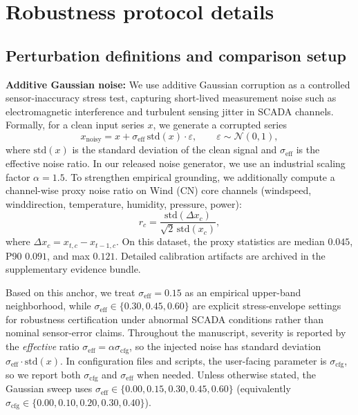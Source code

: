 \documentclass[review,1p,times]{elsarticle}
\begin{document}
\section{Robustness protocol details}\label{app:robust_details}
\subsection{Perturbation definitions and comparison setup}
\noindent\textbf{Additive Gaussian noise:}
We use additive Gaussian corruption as a controlled sensor-inaccuracy stress test, capturing short-lived measurement noise such as electromagnetic interference and turbulent sensing jitter in SCADA channels.
Formally, for a clean input series $x$, we generate a corrupted series
\begin{equation}
x_{\text{noisy}} = x + \sigma_{\mathrm{eff}}\,\mathrm{std}(x)\cdot \varepsilon, \qquad \varepsilon \sim \mathcal{N}(0,1),
\end{equation}
where $\mathrm{std}(x)$ is the standard deviation of the clean signal and $\sigma_{\mathrm{eff}}$ is the effective noise ratio.
In our released noise generator, we use an industrial scaling factor $\alpha=1.5$. To strengthen empirical grounding, we additionally compute a channel-wise proxy noise ratio on Wind (CN) core channels (windspeed, winddirection, temperature, humidity, pressure, power):
\begin{equation}
r_c=\frac{\mathrm{std}(\Delta x_c)}{\sqrt{2}\,\mathrm{std}(x_c)},
\end{equation}
where $\Delta x_c=x_{t,c}-x_{t-1,c}$. On this dataset, the proxy statistics are median $0.045$, P90 $0.091$, and max $0.121$. Detailed calibration artifacts are archived in the supplementary evidence bundle.

Based on this anchor, we treat $\sigma_{\mathrm{eff}}=0.15$ as an empirical upper-band neighborhood, while $\sigma_{\mathrm{eff}}\in\{0.30,0.45,0.60\}$ are explicit stress-envelope settings for robustness certification under abnormal SCADA conditions rather than nominal sensor-error claims. Throughout the manuscript, severity is reported by the \emph{effective} ratio $\sigma_{\mathrm{eff}}=\alpha\sigma_{\mathrm{cfg}}$, so the injected noise has standard deviation $\sigma_{\mathrm{eff}}\cdot\mathrm{std}(x)$. In configuration files and scripts, the user-facing parameter is $\sigma_{\mathrm{cfg}}$, so we report both $\sigma_{\mathrm{cfg}}$ and $\sigma_{\mathrm{eff}}$ when needed. Unless otherwise stated, the Gaussian sweep uses $\sigma_{\mathrm{eff}}\in\{0.00,0.15,0.30,0.45,0.60\}$ (equivalently $\sigma_{\mathrm{cfg}}\in\{0.00,0.10,0.20,0.30,0.40\}$).
\end{document}
